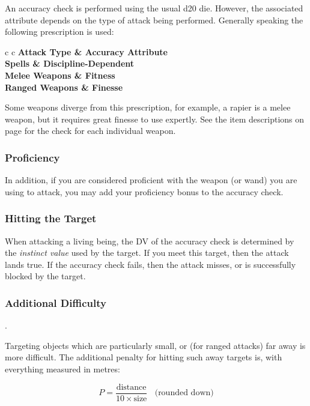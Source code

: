 An accuracy check is performed using the usual d20 die. However, the associated attribute depends on the type of attack being performed. Generally speaking the following prescription is used:

\begin{center}
\begin{rndtable}{c c}
\bf Attack Type	&	\bf Accuracy Attribute
\\
Spells	&	Discipline-Dependent
\\
Melee Weapons	& Fitness
\\
Ranged Weapons	&	Finesse
\end{rndtable}
\end{center}

Some weapons diverge from this prescription, for example, a rapier is a melee weapon, but it requires great finesse to use expertly. See the item descriptions on page \pageref{S:WeaponList} for the check for each individual weapon. 

\subsubsection{Proficiency}

In addition, if you are considered proficient with the weapon (or wand) you are using to attack, you may add your proficiency bonus to the accuracy check. 

\subsubsection{Hitting the Target}

When attacking a living being, the DV of the accuracy check is determined by the {\it instinct value} used by the target. If you meet this target, then the attack lands true. If the accuracy check fails, then the attack misses, or is successfully blocked by the target. 

\subsubsection{Additional Difficulty} \label{S:HardToHit}.

Targeting objects which are particularly small, or (for ranged attacks) far away is more difficult.  The additional penalty for hitting such away targets is, with everything measured in metres:

$$ P = \frac{\text{distance}}{10 \times \text{size}} ~~~~ \text{(rounded down)}$$

